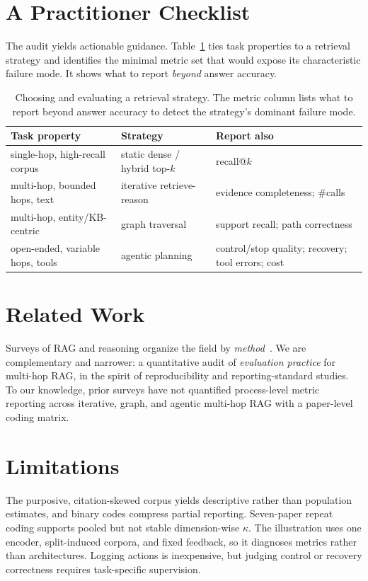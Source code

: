 \documentclass[11pt]{article}
\begin{document}
\section{A Practitioner Checklist}
\label{sec:checklist}
The audit yields actionable guidance. Table~\ref{tab:checklist} ties task properties to a retrieval
strategy and identifies the minimal metric set that would expose its characteristic failure mode. It shows
what to report \emph{beyond} answer accuracy.

\begin{table}[t]\centering\small
\caption{Choosing and evaluating a retrieval strategy. The metric column lists what to report beyond
answer accuracy to detect the strategy's dominant failure mode.}
\label{tab:checklist}
\begin{tabular}{@{}p{2.1cm}p{2.2cm}p{2.35cm}@{}}
\toprule
\textbf{Task property} & \textbf{Strategy} & \textbf{Report also} \\
\midrule
single-hop, high-recall corpus & static dense / hybrid top-$k$ & recall@$k$ \\
multi-hop, bounded hops, text & iterative retrieve-reason & evidence completeness; \#calls \\
multi-hop, entity/KB-centric & graph traversal & support recall; path correctness \\
open-ended, variable hops, tools & agentic planning & control/stop quality; recovery; tool errors; cost \\
\bottomrule
\end{tabular}
\end{table}

\section{Related Work}
Surveys of RAG and reasoning organize the field by
\emph{method}~\citep{gao2023survey,rag_reasoning_survey_2025,agentic_rag_survey_2026}. We are
complementary and narrower: a quantitative audit of \emph{evaluation practice} for multi-hop RAG, in
the spirit of reproducibility and reporting-standard studies. To our knowledge, prior surveys have
not quantified process-level metric reporting across iterative, graph, and agentic multi-hop RAG with
a paper-level coding matrix.

\section{Limitations}
The purposive, citation-skewed corpus yields descriptive rather than population estimates, and binary
codes compress partial reporting. Seven-paper repeat coding supports pooled but not stable dimension-wise
$\kappa$. The illustration uses one encoder, split-induced corpora, and fixed feedback, so it diagnoses
metrics rather than architectures. Logging actions is inexpensive, but judging control or recovery correctness
requires task-specific supervision.
\end{document}
